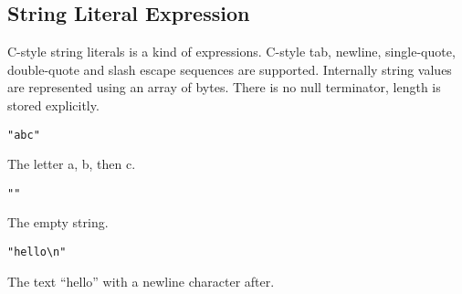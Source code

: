 
\subsection{String Literal Expression}
{
	C-style string literals is a kind of expressions.
	C-style tab, newline, single-quote, double-quote and slash escape sequences
	are supported. Internally string values are represented using an array of
	bytes. There is no null terminator, length is stored explicitly.
	
	\begin{itemize}
	{
		\item[] \lstinline[language=MAIA, columns=fixed]@"abc"@
		
			The letter a, b, then c.
		
		\item[] \lstinline[language=MAIA, columns=fixed]@""@
		
			The empty string.
		
		\item[] \lstinline[language=MAIA, columns=fixed]@"hello\n"@
		
			The text ``hello'' with a newline
			character after.
	}
	\end{itemize}
}
